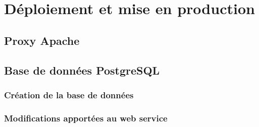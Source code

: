 \section{Déploiement et mise en production}

\subsection{Proxy Apache}


\subsection{Base de données PostgreSQL}

\subsubsection{Création de la base de données}


\subsubsection{Modifications apportées au web service}


